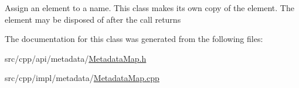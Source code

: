 Assign an element to a name. This class makes its own copy of the element. The element may be disposed of after the call returns 

The documentation for this class was generated from the following files:\begin{DoxyCompactItemize}
\item 
src/cpp/api/metadata/\hyperlink{MetadataMap_8h}{MetadataMap.h}\item 
src/cpp/impl/metadata/\hyperlink{MetadataMap_8cpp}{MetadataMap.cpp}\end{DoxyCompactItemize}
